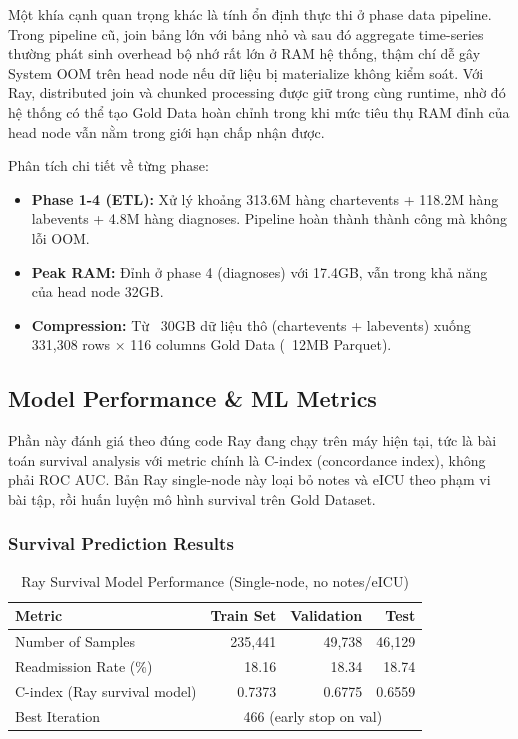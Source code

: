 Một khía cạnh quan trọng khác là tính ổn định thực thi ở phase data pipeline. Trong pipeline cũ, join bảng lớn với bảng nhỏ và sau đó aggregate time-series thường phát sinh overhead bộ nhớ rất lớn ở RAM hệ thống, thậm chí dễ gây System OOM trên head node nếu dữ liệu bị materialize không kiểm soát. Với Ray, distributed join và chunked processing được giữ trong cùng runtime, nhờ đó hệ thống có thể tạo Gold Data hoàn chỉnh trong khi mức tiêu thụ RAM đỉnh của head node vẫn nằm trong giới hạn chấp nhận được. 

Phân tích chi tiết về từng phase:
\begin{itemize}
    \item \textbf{Phase 1-4 (ETL):} Xử lý khoảng 313.6M hàng chartevents + 118.2M hàng labevents + 4.8M hàng diagnoses. Pipeline hoàn thành thành công mà không lỗi OOM.
    \item \textbf{Peak RAM:} Đỉnh ở phase 4 (diagnoses) với 17.4GB, vẫn trong khả năng của head node 32GB.
    \item \textbf{Compression:} Từ ~30GB dữ liệu thô (chartevents + labevents) xuống 331,308 rows × 116 columns Gold Data (~12MB Parquet).
\end{itemize}

\subsection{Model Performance \& ML Metrics}

Phần này đánh giá theo đúng code Ray đang chạy trên máy hiện tại, tức là bài toán survival analysis với metric chính là C-index (concordance index), không phải ROC AUC. Bản Ray single-node này loại bỏ notes và eICU theo phạm vi bài tập, rồi huấn luyện mô hình survival trên Gold Dataset.

\subsubsection{Survival Prediction Results}

\begin{table}[h!]
\centering
\small
\begin{tabular}{|l|r|r|r|}
\hline
\textbf{Metric} & \textbf{Train Set} & \textbf{Validation} & \textbf{Test} \\
\hline
Number of Samples & 235,441 & 49,738 & 46,129 \\
Readmission Rate (\%) & 18.16 & 18.34 & 18.74 \\
C-index (Ray survival model) & 0.7373 & 0.6775 & 0.6559 \\
Best Iteration & \multicolumn{3}{c|}{466 (early stop on val)} \\
\hline
\end{tabular}
\caption{Ray Survival Model Performance (Single-node, no notes/eICU)}
\label{table:xgbse_metrics}
\end{table}

